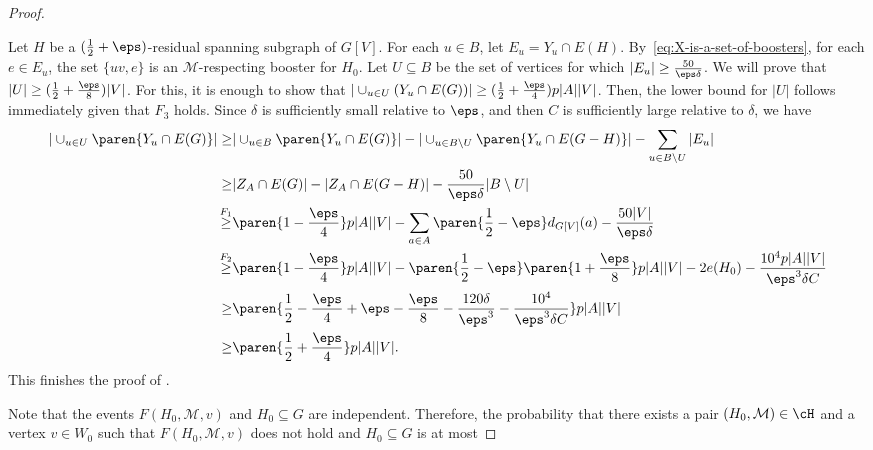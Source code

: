 \documentclass[10pt,a4paper,reqno]{amsart}
\begin{document}
\begin{proof}
\begin{claimproof}
Let $H$ be a $(\frac{1}{2} + \eps)$-residual spanning subgraph of $G[V]$. For each $u \in B$, let $E_u = Y_u \cap E(H)$. By~\eqref{eq:X-is-a-set-of-boosters}, for each $e \in E_u$, the set $\{uv, e\}$ is an $\mathcal{M}$-respecting booster for $H_0$. Let $U \subseteq B$ be the set of vertices for which $|E_u| \geq \frac{50}{\eps\delta}$. We will prove that $|U| \geq (\frac{1}{2} + \frac{\eps}{8}) |V|$. For this, it is enough to show that $|\cup_{u \in U}(Y_u \cap E(G))| \geq (\frac{1}{2} + \frac{\eps}{4}) p |A| |V|$. Then, the lower bound for $|U|$ follows immediately given that $F_3$ holds. Since $\delta$ is sufficiently small relative to $\eps$, and then $C$ is sufficiently large relative to $\delta$, we have
\begin{align*}
    |\cup_{u \in U} \paren{Y_u \cap E(G)}| \geq& |\cup_{u \in B} \paren{Y_u \cap E(G)}| - |\cup_{u \in B \setminus U} \paren{Y_u\cap E(G - H)}| - \sum_{u \in B \setminus U} |E_u| \\
    \geq& |Z_A \cap E(G)| - |Z_A \cap E(G - H)| - \frac{50}{\eps\delta} |B \setminus U|\\
    \stackrel{F_1}{\geq}& \paren{1 - \frac{\eps}{4}} p |A| |V| - \sum_{a \in A} \paren{\frac{1}{2} - \eps} d_{G[V]}(a) - \frac{50|V|}{\eps \delta} \\
    \stackrel{F_2}{\geq}& \paren{1 - \frac{\eps}{4}} p |A| |V| - \paren{\frac{1}{2} - \eps} \paren{1 + \frac{\eps}{8}} p|A| |V| - 2e(H_0) - \frac{10^4 p |A| |V|}{\eps^3 \delta C} \\
    \geq& \paren{\frac{1}{2} - \frac{\eps}{4} + \eps - \frac{\eps}{8} - \frac{120 \delta}{\eps^3} - \frac{10^4}{\eps^3 \delta C}} p |A| |V| \\
    \geq& \paren{\frac{1}{2} + \frac{\eps}{4}} p |A| |V|.
\end{align*}
This finishes the proof of .
\end{claimproof}
  
Note that the events $F(H_0, \mathcal{M}, v)$ and $H_0 \subseteq G$ are independent. Therefore, the probability that there exists a pair $(H_0, \mathcal{M}) \in \cH$ and a vertex $v \in W_0$ such that $F(H_0, \mathcal{M}, v)$ does not hold and $H_0 \subseteq G$ is at most
  

\end{proof}
\end{document}
